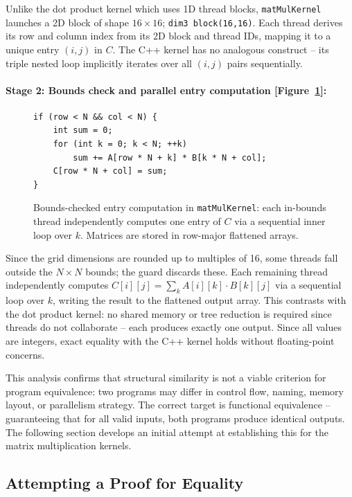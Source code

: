 \documentclass{article}
\begin{document}
Unlike the dot product kernel which uses 1D thread blocks, \texttt{matMulKernel} launches a 2D block of shape $16 \times 16$; \texttt{dim3 block(16,16)}. Each thread derives its row and column index from its 2D block and thread IDs, mapping it to a unique entry $(i, j)$ in $C$. The C++ kernel has no analogous construct -- its triple nested loop implicitly iterates over all $(i, j)$ pairs sequentially.

\paragraph{Stage 2: Bounds check and parallel entry computation [Figure~\ref{fig:mat_mult_compute}]:}

\begin{figure}[H]
\begin{verbatim}
if (row < N && col < N) {
    int sum = 0;
    for (int k = 0; k < N; ++k)
        sum += A[row * N + k] * B[k * N + col];
    C[row * N + col] = sum;
}
\end{verbatim}
    \caption{Bounds-checked entry computation in \texttt{matMulKernel}: each in-bounds thread independently computes one entry of $C$ via a sequential inner loop over $k$. Matrices are stored in row-major flattened arrays.}
    \label{fig:mat_mult_compute}
\end{figure}

Since the grid dimensions are rounded up to multiples of 16, some threads fall outside the $N \times N$ bounds; the guard discards these. Each remaining thread independently computes $C[i][j] = \sum_k A[i][k] \cdot B[k][j]$ via a sequential loop over $k$, writing the result to the flattened output array. This contrasts with the dot product kernel: no shared memory or tree reduction is required since threads do not collaborate -- each produces exactly one output. Since all values are integers, exact equality with the C++ kernel holds without floating-point concerns.

This analysis confirms that structural similarity is not a viable criterion for program equivalence: two programs may differ in control flow, naming, memory layout, or parallelism strategy. The correct target is functional equivalence -- guaranteeing that for all valid inputs, both programs produce identical outputs. The following section develops an initial attempt at establishing this for the matrix multiplication kernels.

\subsection{Attempting a Proof for Equality}
\label{subsec:proof-equality}
\end{document}
